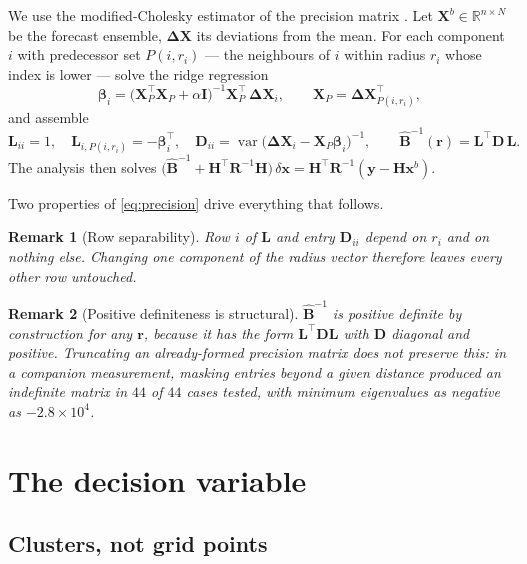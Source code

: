 \documentclass[11pt,a4paper]{article}
\newtheorem{remark}{Remark}
\theoremstyle{definition}
\newcommand{\Bmat}{\mathbf{B}}
\newcommand{\Lmat}{\mathbf{L}}
\newcommand{\Dmat}{\mathbf{D}}
\newcommand{\Hmat}{\mathbf{H}}
\newcommand{\Rmat}{\mathbf{R}}
\newcommand{\Xmat}{\mathbf{X}}
\newcommand{\xvec}{\mathbf{x}}
\newcommand{\yvec}{\mathbf{y}}
\newcommand{\rvec}{\mathbf{r}}
\begin{document}
We use the modified-Cholesky estimator of the precision matrix
\cite{bickel2008,nino2018}. Let $\Xmat^b \in \mathbb{R}^{n \times N}$ be the
forecast ensemble, $\mathbf{\Delta X}$ its deviations from the mean. For each
component $i$ with predecessor set $P(i, r_i)$ --- the neighbours of $i$ within
radius $r_i$ whose index is lower --- solve the ridge regression
%
\begin{equation}
  \boldsymbol{\beta}_i
  = \big(\Xmat_{P}^{\top}\Xmat_{P} + \alpha \mathbf{I}\big)^{-1}
    \Xmat_{P}^{\top}\,\mathbf{\Delta X}_{i},
  \qquad
  \Xmat_{P} = \mathbf{\Delta X}_{P(i,r_i)}^{\top},
  \label{eq:ridge}
\end{equation}
%
and assemble
%
\begin{equation}
  \Lmat_{ii} = 1, \quad
  \Lmat_{i,P(i,r_i)} = -\boldsymbol{\beta}_i^{\top}, \quad
  \Dmat_{ii} = \operatorname{var}\!\big(\mathbf{\Delta X}_i - \Xmat_P \boldsymbol{\beta}_i\big)^{-1},
  \qquad
  \widehat{\Bmat}^{-1}(\rvec) = \Lmat^{\top}\Dmat\,\Lmat .
  \label{eq:precision}
\end{equation}
%
The analysis then solves
$\big(\widehat{\Bmat}^{-1} + \Hmat^{\top}\Rmat^{-1}\Hmat\big)\,
 \delta\xvec = \Hmat^{\top}\Rmat^{-1}(\yvec - \Hmat\xvec^b)$.

Two properties of \eqref{eq:precision} drive everything that follows.

\begin{remark}[Row separability]
Row $i$ of $\Lmat$ and entry $\Dmat_{ii}$ depend on $r_i$ \emph{and on nothing
else}. Changing one component of the radius vector therefore leaves every other
row untouched.
\end{remark}

\begin{remark}[Positive definiteness is structural]
$\widehat{\Bmat}^{-1}$ is positive definite by construction for any $\rvec$,
because it has the form $\Lmat^{\top}\Dmat\Lmat$ with $\Dmat$ diagonal and
positive. Truncating an already-formed precision matrix does not preserve this:
in a companion measurement, masking entries beyond a given distance produced an
indefinite matrix in $44$ of $44$ cases tested, with minimum eigenvalues as
negative as $-2.8\times 10^{4}$.
\end{remark}

\section{The decision variable}

\subsection{Clusters, not grid points}
\end{document}
